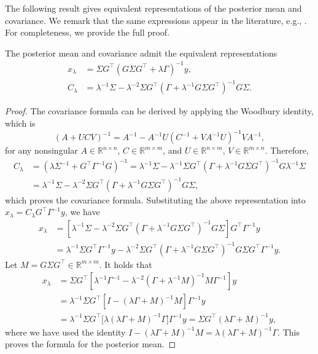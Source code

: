 \documentclass[]{myarticle}
\begin{document}
The following result gives equivalent representations of the posterior mean and covariance. We remark that the same expressions appear in the literature, e.g., \cite{Kaip2006,Stuart2010}. For completeness, we 
provide the full proof.

\begin{proposition}\label{prop:post1}
  The posterior mean and covariance admit the equivalent representations
  \begin{align}
    x_{\lambda} &= \Sigma G^{\top}(G\Sigma G^{\top}+\lambda\Gamma)^{-1}y , \label{post_mean1} \\
    C_{\lambda} &= \lambda^{-1}\Sigma - \lambda^{-2}\Sigma G^{\top}(\Gamma+\lambda^{-1}G\Sigma G^{\top})^{-1}G\Sigma . \label{post_cov1}
  \end{align}
\end{proposition}
\begin{proof}
    The covariance formula can be derived by applying the Woodbury identity, which is
    \[(A+UCV)^{-1}=A^{-1}-A^{-1}U(C^{-1}+VA^{-1}U)^{-1}VA^{-1}, \]
    for any nonsingular $A\in\mathbb{R}^{n\times n}$, $C\in\mathbb{R}^{m\times m}$, and $U\in\mathbb{R}^{n\times m}$, $V\in\mathbb{R}^{m\times n}$. Therefore,
    \begin{align*}
      C_\lambda
      &= (\lambda\Sigma^{-1}+G^\top\Gamma^{-1}G)^{-1} 
      = \lambda^{-1}\Sigma-\lambda^{-1}\Sigma G^\top(\Gamma+\lambda^{-1}G\Sigma G^\top)^{-1}G\lambda^{-1}\Sigma \\
      &= \lambda^{-1}\Sigma - \lambda^{-2}\Sigma G^\top (\Gamma+\lambda^{-1}G\Sigma G^\top)^{-1}G\Sigma,
    \end{align*}
    which proves the covariance formula. Substituting the above representation into $x_\lambda=C_\lambda G^\top\Gamma^{-1}y$, we have
  \begin{align*}
    x_\lambda 
    &= \left[\lambda^{-1}\Sigma - \lambda^{-2}\Sigma G^\top(\Gamma+\lambda^{-1}G\Sigma G^\top)^{-1}G\Sigma \right] G^\top\Gamma^{-1}y \\
    &= \lambda^{-1}\Sigma G^\top\Gamma^{-1}y - \lambda^{-2}\Sigma G^\top (\Gamma+\lambda^{-1}G\Sigma G^\top)^{-1} G\Sigma G^\top\Gamma^{-1}y.
  \end{align*}
  Let $M=G\Sigma G^\top \in \mathbb R^{m\times m}$. It holds that
  \begin{align*}\label{eq:xlambda-proof-mid}
    x_\lambda 
    &= \Sigma G^\top \left[\lambda^{-1}\Gamma^{-1}-\lambda^{-2}(\Gamma+\lambda^{-1}M)^{-1}M\Gamma^{-1}\right]y \\
    &= \lambda^{-1}\Sigma G^\top\left[I-(\lambda\Gamma+M)^{-1}M\right]\Gamma^{-1}y \\
    &= \lambda^{-1}\Sigma G^\top\bigl[\lambda(\lambda\Gamma+M)^{-1}\Gamma\bigr]\Gamma^{-1}y 
    = \Sigma G^\top(\lambda\Gamma+M)^{-1}y,
  \end{align*}
  where we have used the identity $I-(\lambda\Gamma+M)^{-1}M = \lambda(\lambda\Gamma+M)^{-1}\Gamma.$ This proves the formula for the posterior mean.
\end{proof}
\end{document}
